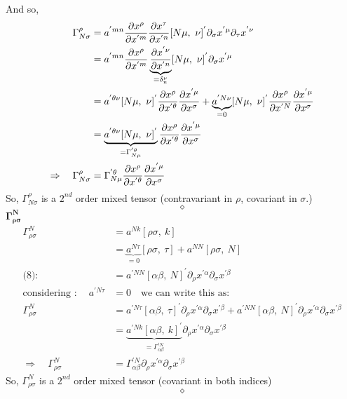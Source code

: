 And so,
\begin{align}
 \Gamma^{\rho}_{N \sigma} &=a^{'mn}\pdv{x^{\rho}}{x^{'m}}\pdv{x^{\tau}}{x^{'n}}[ N \mu, \ \nu]^{'}\partial_{\sigma}x^{'\mu}\partial_{\tau}x^{'\nu}\\
\ &=a^{'mn}\pdv{x^{\rho}}{x^{'m}}\underbrace{\pdv{x^{'\nu}}{x^{'n}}}_{= \delta^{\nu}_{n}}[ N \mu, \ \nu]^{'}\partial_{\sigma}x^{'\mu}\\
\ &=a^{'\theta \nu }[ N \mu, \ \nu]^{'}\pdv{x^{\rho}}{x^{'\theta}}\pdv{x^{'\mu}}{x^{\sigma}}+ \underbrace{a^{'N \nu }}_{=0}[ N \mu, \ \nu]^{'}\pdv{x^{\rho}}{x^{'N}}\pdv{x^{'\mu}}{x^{\sigma}}\\
\ &=\underbrace{a^{'\theta \nu }[ N \mu, \ \nu]^{'}}_{ = \Gamma^{'\theta}_{N\mu}}\pdv{x^{\rho}}{x^{'\theta}}\pdv{x^{'\mu}}{x^{\sigma}}\\
\Rightarrow \quad \Gamma^{\rho}_{N \sigma} &=  \Gamma^{'\theta}_{N\mu}\pdv{x^{\rho}}{x^{'\theta}}\pdv{x^{'\mu}}{x^{\sigma}}
\end{align}
So, $\Gamma^{\rho}_{N \sigma}$ is a $2^{nd}$ order mixed tensor (contravariant in $\rho$, covariant in $\sigma$.)
$$\diamond$$
$\boldsymbol{\Gamma^{N }_{\rho \sigma}}$\\
\begin{align}
\Gamma^{N }_{\rho \sigma} &= a^{N  k}[\rho \sigma,\ k]\\
\ & = \underbrace{a^{N \tau}}_{=0}[\rho \sigma,\ \tau]+ a^{N N}[\rho \sigma,\ N]\\
\text{(8):}\quad &= a^{'NN}[\alpha \beta, \ N]^{'}\partial_{\rho}x^{'\alpha}\partial_{\sigma}x^{'\beta}\\
\text{considering :}\quad \ a^{'N \tau} & =0 \quad \text{we can write this as:}\\
\Gamma^{N }_{\rho \sigma} &=a^{'N \tau}[\alpha \beta, \ \tau]^{'}\partial_{\rho}x^{'\alpha}\partial_{\sigma}x^{'\beta}+ a^{'NN}[\alpha \beta, \ N]^{'}\partial_{\rho}x^{'\alpha}\partial_{\sigma}x^{'\beta}\\
\ &=\underbrace{a^{'N k}[\alpha \beta, \ k]^{'}}_{= \Gamma^{'N}_{\alpha \beta}}\partial_{\rho}x^{'\alpha}\partial_{\sigma}x^{'\beta}\\
\Rightarrow \quad \Gamma^{N }_{\rho \sigma} &= \Gamma^{'N}_{\alpha \beta}\partial_{\rho}x^{'\alpha}\partial_{\sigma}x^{'\beta}
\end{align}
So, $\Gamma^{N }_{\rho \sigma}$ is a $2^{nd}$ order mixed tensor (covariant in both indices)
$$\diamond$$

